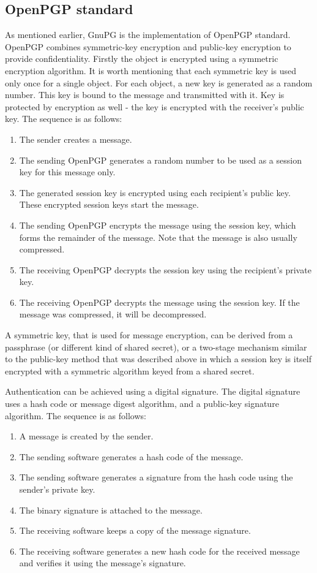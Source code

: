 \subsection{OpenPGP standard}
As mentioned earlier, GnuPG is the implementation of OpenPGP standard. OpenPGP combines symmetric-key encryption and public-key encryption to provide confidentiality.   Firstly the object is encrypted using a symmetric encryption algorithm. It is worth mentioning that each symmetric key is used only once for a single object. For each object, a new key is generated as a random number. This key is bound to the message and transmitted with it. Key is protected by encryption as well - the key is encrypted with the receiver's public key. The sequence is as follows:
\begin{enumerate}
    \item The sender creates a message.
    \item The sending OpenPGP generates a random number to be used as a session key for this message only.
    \item The generated session key is encrypted using each recipient's public key. These encrypted session keys start the message.
    \item The sending OpenPGP encrypts the message using the session key, which forms the remainder of the message. Note that the message is also usually compressed.
    \item The receiving OpenPGP decrypts the session key using the recipient's private key.
    \item The receiving OpenPGP decrypts the message using the session key. If the message was compressed, it will be decompressed.
\end{enumerate}

A symmetric key, that is used for message encryption, can be derived from a passphrase (or different kind of shared secret), or a two-stage mechanism similar to the public-key method that was described above in which a session key is itself encrypted with a symmetric algorithm keyed from a shared secret.

Authentication can be achieved using a digital signature. The digital signature uses a hash code or message digest algorithm, and a public-key signature algorithm. The sequence is as follows:
\begin{enumerate}
    \item A message is created by the sender.
    \item The sending software generates a hash code of the message.
    \item The sending software generates a signature from the hash code using the sender's private key.
    \item The binary signature is attached to the message.
    \item The receiving software keeps a copy of the message signature.
    \item The receiving software generates a new hash code for the received message and verifies it using the message's signature.
\end{enumerate}

